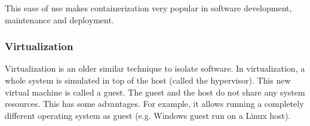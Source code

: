 \hfill

This ease of use makes containerization very popular in software development, maintenance and deployment.

\pagebreak

\subsubsection{Virtualization}
Virtualization is an older similar technique to isolate software. In virtualization, a whole system is simulated in top of the host (called the hypervisor). This new virtual machine is called a guest. The guest and the host do not share any system resources. This has some advantages. For example, it allows running a completely different operating system as guest (e.g. Windows guest run on a Linux host).

